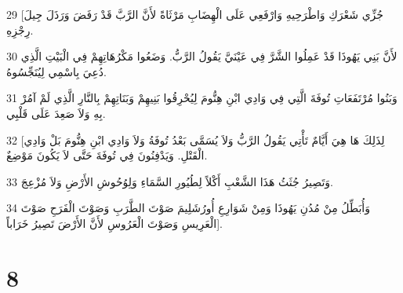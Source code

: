 \par 29 [جُزِّي شَعْرَكِ وَاطْرَحِيهِ وَارْفَعِي عَلَى الْهِضَابِ مَرْثَاةً لأَنَّ الرَّبَّ قَدْ رَفَضَ وَرَذَلَ جِيلَ رِجْزِهِ.
\par 30 لأَنَّ بَنِي يَهُوذَا قَدْ عَمِلُوا الشَّرَّ فِي عَيْنَيَّ يَقُولُ الرَّبُّ. وَضَعُوا مَكْرُهَاتِهِمْ فِي الْبَيْتِ الَّذِي دُعِيَ بِاسْمِي لِيُنَجِّسُوهُ.
\par 31 وَبَنُوا مُرْتَفَعَاتِ تُوفَةَ الَّتِي فِي وَادِي ابْنِ هِنُّومَ لِيُحْرِقُوا بَنِيهِمْ وَبَنَاتِهِمْ بِالنَّارِ الَّذِي لَمْ آمُرْ بِهِ وَلاَ صَعِدَ عَلَى قَلْبِي.
\par 32 [لِذَلِكَ هَا هِيَ أَيَّامٌ تَأْتِي يَقُولُ الرَّبُّ وَلاَ يُسَمَّى بَعْدُ تُوفَةُ وَلاَ وَادِي ابْنِ هِنُّومَ بَلْ وَادِي الْقَتْلِ. وَيَدْفِنُونَ فِي تُوفَةَ حَتَّى لاَ يَكُونَ مَوْضِعٌ.
\par 33 وَتَصِيرُ جُثَثُ هَذَا الشَّعْبِ أَكْلاً لِطُيُورِ السَّمَاءِ وَلِوُحُوشِ الأَرْضِ وَلاَ مُزْعِجَ.
\par 34 وَأُبَطِّلُ مِنْ مُدُنِ يَهُوذَا وَمِنْ شَوَارِعِ أُورُشَلِيمَ صَوْتَ الطَّرَبِ وَصَوْتَ الْفَرَحِ صَوْتَ الْعَرِيسِ وَصَوْتَ الْعَرُوسِ لأَنَّ الأَرْضَ تَصِيرُ خَرَاباً].

\chapter{8}

